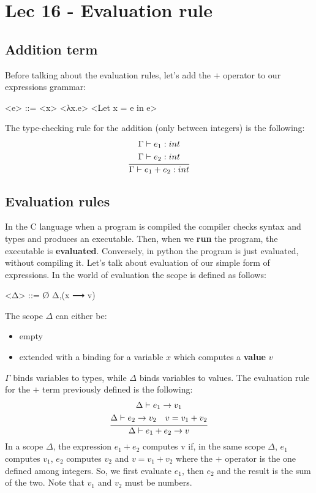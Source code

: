 \chapter{Lec 16 - Evaluation rule}

\section{Addition term}
Before talking about the evaluation rules, let's add the $+$ operator to our expressions grammar:
\begin{grammar}
    <e> ::= <x>
    \alt <λx.e> 
    \alt <Let x = e in e>
\end{grammar}
The type-checking rule for the addition (only between integers) is the following:
\[
    \infer{\Gamma \vdash e_{1} + e_{2}:int}{
    \begin{gathered}
        \Gamma \vdash e_{1}: int \\
        \Gamma \vdash e_{2}:int
    \end{gathered}}
\]

\section{Evaluation rules}
In the C language when a program is compiled the compiler checks syntax and types and produces an executable. Then, when we \textbf{run} the program, the executable is \textbf{evaluated}. Conversely, in python the program is just evaluated, without compiling it.\newline\newline
Let's talk about evaluation of our simple form of expressions.\newline\newline
In the world of evaluation the scope is defined as follows:
\begin{grammar}
    <Δ> ::= Ø
    \alt Δ,(x ⟶ v)
\end{grammar}
The scope $\Delta$ can either be:
\begin{itemize}
    \item empty
    \item extended with a binding for a variable $x$ which computes a \textbf{value} $v$ 
\end{itemize}
$\Gamma$ binds variables to types, while $\Delta$ binds variables to values.\newline\newline
The evaluation rule for the $+$ term previously defined is the following:
\[ \infer{\Delta \vdash e_{1} + e_{2} \rightarrow v}{
\begin{gathered}
    \Delta \vdash e_{1} \rightarrow v_{1}\\
    \Delta \vdash e_{2} \rightarrow v_{2} \quad v = v_{1} + v_{2} 
\end{gathered}}\]
In a scope $\Delta$, the expression $e_{1} + e_{2}$ computes v if, in the same scope $\Delta$, $e_{1}$ computes $v_{1}$, $e_{2}$ computes $v_{2}$ and $v = v_{1} + v_{2}$ where the $+$ operator is the one defined among integers. So, we first evaluate $e_{1}$, then $e_{2}$ and the result is the sum of the two. Note that $v_{1}$ and $v_{2}$ must be numbers.
